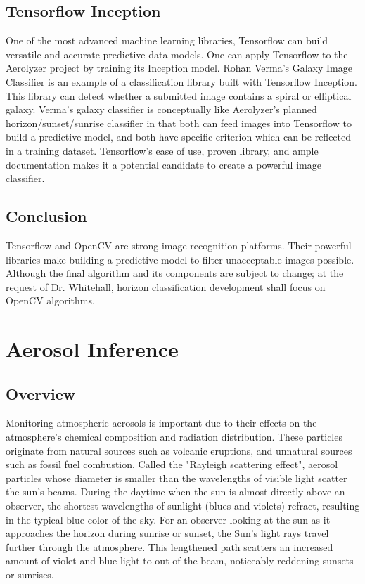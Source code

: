 \documentclass[onecolumn, draftclsnofoot,10pt, compsoc]{IEEEtran}
\begin{document}
\begin{singlespace}
	\subsection{Tensorflow Inception}
		One of the most advanced machine learning libraries, Tensorflow can build versatile and accurate predictive data models.
		One can apply Tensorflow to the Aerolyzer project by training its Inception model.
		Rohan Verma’s Galaxy Image Classifier is an example of a classification library built with Tensorflow Inception.
		This library can detect whether a submitted image contains a spiral or elliptical galaxy.
		Verma’s galaxy classifier is conceptually like Aerolyzer’s planned horizon/sunset/sunrise classifier in that both can feed images into Tensorflow to build a predictive model, and both have specific criterion which can be reflected in a training dataset.
		Tensorflow’s ease of use, proven library, and ample documentation makes it a potential candidate to create a powerful image classifier. \cite{rhnvrm}
		
	\subsection{Conclusion}
		Tensorflow and OpenCV are strong image recognition platforms.
		Their powerful libraries make building a predictive model to filter unacceptable images possible.
		Although the final algorithm and its components are subject to change; at the request of Dr.
		Whitehall, horizon classification development shall focus on OpenCV algorithms.


\section{Aerosol Inference}
	\subsection{Overview}
		Monitoring atmospheric aerosols is important due to their effects on the atmosphere's chemical composition and radiation distribution.
		These particles originate from natural sources such as volcanic eruptions, and unnatural sources such as fossil fuel combustion.
		Called the "Rayleigh scattering effect", aerosol particles whose diameter is smaller than the wavelengths of visible light scatter the sun’s beams.
		During the daytime when the sun is almost directly above an observer, the shortest wavelengths of sunlight (blues and violets) refract, resulting in the typical blue color of the sky.
		For an observer looking at the sun as it approaches the horizon during sunrise or sunset, the Sun’s light rays travel further through the atmosphere.
		This lengthened path scatters an increased amount of violet and blue light to out of the beam, noticeably reddening sunsets or sunrises. \cite{corfidi_2014}
		


\end{singlespace}
\end{document}
